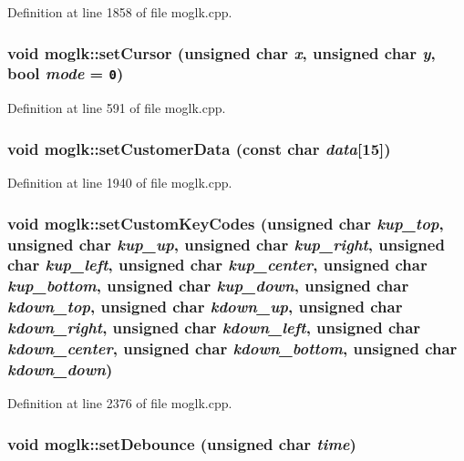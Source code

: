 Definition at line 1858 of file moglk.cpp.\hypertarget{classmoglk_15e0fbeefcab8874138e8865c53e204c}{
\subsubsection[{setCursor}]{\setlength{\rightskip}{0pt plus 5cm}void moglk::setCursor (unsigned char {\em x}, \/  unsigned char {\em y}, \/  bool {\em mode} = {\tt 0})}}
\label{classmoglk_15e0fbeefcab8874138e8865c53e204c}




Definition at line 591 of file moglk.cpp.\hypertarget{classmoglk_fbbdba07a24998b82fa0690a6a4d5f31}{
\subsubsection[{setCustomerData}]{\setlength{\rightskip}{0pt plus 5cm}void moglk::setCustomerData (const char {\em data}\mbox{[}15\mbox{]})}}
\label{classmoglk_fbbdba07a24998b82fa0690a6a4d5f31}




Definition at line 1940 of file moglk.cpp.\hypertarget{classmoglk_fbe1a25a8d461d02dd84df8b7a8b796b}{
\subsubsection[{setCustomKeyCodes}]{\setlength{\rightskip}{0pt plus 5cm}void moglk::setCustomKeyCodes (unsigned char {\em kup\_\-top}, \/  unsigned char {\em kup\_\-up}, \/  unsigned char {\em kup\_\-right}, \/  unsigned char {\em kup\_\-left}, \/  unsigned char {\em kup\_\-center}, \/  unsigned char {\em kup\_\-bottom}, \/  unsigned char {\em kup\_\-down}, \/  unsigned char {\em kdown\_\-top}, \/  unsigned char {\em kdown\_\-up}, \/  unsigned char {\em kdown\_\-right}, \/  unsigned char {\em kdown\_\-left}, \/  unsigned char {\em kdown\_\-center}, \/  unsigned char {\em kdown\_\-bottom}, \/  unsigned char {\em kdown\_\-down})}}
\label{classmoglk_fbe1a25a8d461d02dd84df8b7a8b796b}




Definition at line 2376 of file moglk.cpp.\hypertarget{classmoglk_39a75ecd8ae42aedc0c6fa94e29da5e2}{
\subsubsection[{setDebounce}]{\setlength{\rightskip}{0pt plus 5cm}void moglk::setDebounce (unsigned char {\em time})}}
\label{classmoglk_39a75ecd8ae42aedc0c6fa94e29da5e2}




